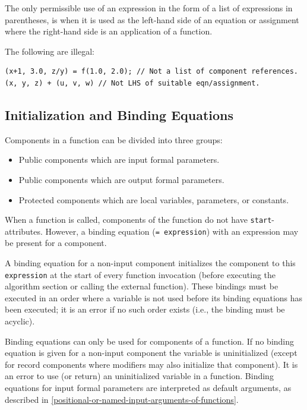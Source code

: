 The only permissible use of an expression in the form of a list of expressions in parentheses, is when it is used as the left-hand side of an equation or assignment where the right-hand side is an application of a function.

\begin{example}
The following are illegal:
\begin{lstlisting}[language=modelica]
(x+1, 3.0, z/y) = f(1.0, 2.0); // Not a list of component references.
(x, y, z) + (u, v, w) // Not LHS of suitable eqn/assignment.
\end{lstlisting}
\end{example}

\subsection{Initialization and Binding Equations}%
\label{initialization-and-binding-equations-of-components-in-functions}%
\label{initialization-and-declaration-assignments-of-components-in-functions}

Components in a function can be divided into three groups:
\begin{itemize}
\item
  Public components which are input formal parameters.
\item
  Public components which are output formal parameters.
\item
  Protected components which are local variables, parameters, or constants.
\end{itemize}

When a function is called, components of the function do not have \lstinline!start!-attributes.
However, a binding equation (\lstinline!= expression!) with an expression may be present for a component.

A binding equation for a non-input component initializes the component to this \lstinline!expression! at the start of every function invocation (before executing the algorithm section or calling the external function).
These bindings must be executed in an order where a variable is not used before its binding equations has been executed; it is an error if no such order exists (i.e., the binding must be acyclic).

Binding equations can only be used for components of a function.
If no binding equation is given for a non-input component the variable is uninitialized (except for record components where modifiers may also initialize that component).
It is an error to use (or return) an uninitialized variable in a function.
Binding equations for input formal parameters are interpreted as default arguments, as described in
\cref{positional-or-named-input-arguments-of-functions}.

